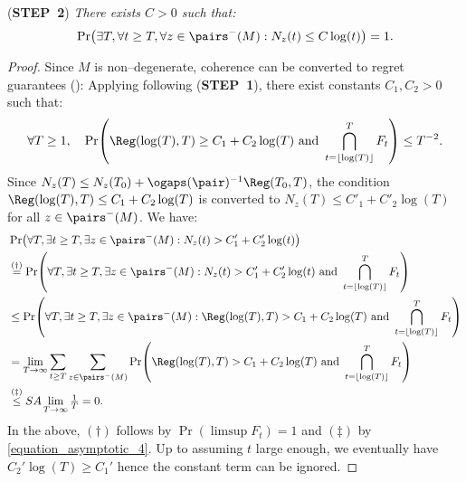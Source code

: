\documentclass[preprint,cleveref,12pt]{colt2025}
\DeclarePairedDelimiter{\parens}{(}{)}	%
\def\STEP#1{(\strong{STEP~#1})}
\newcommand{\strong}[1]{\textbf{#1}}
\begin{document}
    \noindent
    \STEP{2}
    \textit{
        There exists $C > 0$ such that:
        \begin{equation}
        \label{equation_asymptotic_4_5}
            \Pr \parens*{
                \exists T,
                \forall t \ge T,
                \forall z \in \pairs^-(M):
                N_z(t) \le C \log(t)
            }
            =
            1
            .
        \end{equation}
    }
    \begin{proof}
        Since $M$ is non--degenerate, coherence can be converted to regret guarantees (): Applying  following \STEP{1}, there exist constants $C_1, C_2 > 0$ such that:
        \begin{equation}
        \label{equation_asymptotic_4}
            \forall T \ge 1,
            \quad
            \Pr\parens*{
                \Reg(\log(T), T) \ge C_1 + C_2 \log(T)
                \text{~and~}
                \bigcap_{t=\lfloor\log(T)\rfloor}^T F_t
            }
            \le
            T^{-2}.
        \end{equation}
        Since $N_z(T) \le N_z(T_0) + \ogaps(\pair)^{-1} \Reg(T_0, T)$, the condition $\Reg(\log(T), T) \le C_1 + C_2 \log(T)$ is converted to $N_z(T) \le C'_1 + C'_2 \log(T)$ for all $z \in \pairs^-(M)$. 
        We have:
        \begin{align*}
            & \Pr\parens*{
                \forall T,
                \exists t \ge T,
                \exists z \in \pairs^-(M):
                N_z(t) > C'_1 + C'_2 \log(t)
            }
            \\
            & \overset{(\dagger)}=
            \Pr\parens*{
                \forall T,
                \exists t \ge T,
                \exists z \in \pairs^-(M):
                N_z(t) > C'_1 + C'_2 \log(t) 
                \text{~and~}
                \bigcap_{t=\lfloor \log(T)\rfloor}^T
                F_t
            }
            \\
            & \le
            \Pr\parens*{
                \forall T,
                \exists t \ge T,
                \exists z \in \pairs^-(M):
                \Reg(\log(T), T) > C_1 + C_2 \log(T)
                \text{~and~}
                \bigcap_{t=\lfloor \log(T)\rfloor}^T
                F_t
            }
            \\
            & =
            \lim_{T\to\infty}
            \sum_{t \ge T}
            \sum_{z \in \pairs^-(M)}
            \Pr\parens*{
                \Reg(\log(T), T) > C_1 + C_2 \log(T)
                \text{~and~}
                \bigcap_{t=\lfloor \log(T)\rfloor}^T
                F_t
            }
            \\
            & \overset{(\ddagger)}\le 
            SA \lim_{T \to \infty} \tfrac 1T 
            = 0.
        \end{align*}
        In the above, $(\dagger)$ follows by $\Pr(\limsup F_t) = 1$ and $(\ddagger)$ by \eqref{equation_asymptotic_4}.
        Up to assuming $t$ large enough, we eventually have $C_2' \log(T) \ge C_1'$ hence the constant term can be ignored.
    \end{proof}
\end{document}
